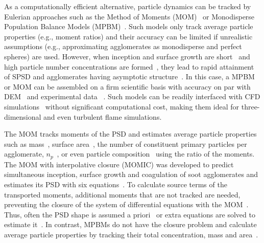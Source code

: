 As a computationally efficient alternative, particle dynamics can be tracked by Eulerian approaches such as the Method of Moments (MOM)~\citep{kazakov1998dynamic} or Monodisperse Population Balance Models (MPBM)~\citep{kruis1993simple}. Such models only track average particle properties (e.g., moment ratios) and their accuracy can be limited if unrealistic assumptions (e.g., approximating agglomerates as monodisperse and perfect spheres) are used. However, when inception and surface growth are short~\citep{Spicer2002} and high particle number concentrations are formed~\cite{Kelesidis2017}, they lead to rapid attainment of SPSD and agglomerates having asymptotic structure~\citep{Goudeli2016}. In this case, a MPBM or MOM can be assembled on a firm scientific basis with accuracy on par with DEM~\citep{Kelesidis2017Flame} and experimental data ~\citep{abid2008evolution, ma2013soot, camacho2015mobility}. Such models can be readily interfaced with CFD simulations~\citep{grohn2012fluid} without significant computational cost, making them ideal for three-dimensional and even turbulent flame simulations. 

The MOM tracks moments of the PSD and estimates average particle properties such as mass~\citep{pratsinis1988simultaneous}, surface area~\citep{blanquart2009joint}, the number of constituent primary particles per agglomerate, ${n_p}$~\citep{kazakov1998dynamic}, or even particle composition~\citep{blanquart2009analyzing} using the ratio of the moments. The MOM with interpolative closure (MOMIC) was developed to predict simultaneous inception, surface growth and coagulation of soot agglomerates and estimates its PSD with six equations~\citep{kazakov1998dynamic}. To calculate source terms of the transported moments, additional moments that are not tracked are needed, preventing the closure of the system of differential equations with the MOM~\citep{pratsinis1988simultaneous, frenklach1987aerosol}. Thus, often the PSD shape is assumed a priori~\citep{pratsinis1988simultaneous} or extra equations are solved to estimate it~\citep{kruis1993simple}. In contrast, MPBMs do not have the closure problem and calculate average particle properties by tracking their total concentration, mass \citep{kruis1993simple} and area~\citep{tsantilis2004soft, lindstedt1994simplified}. 

